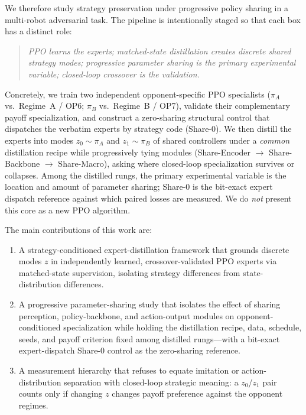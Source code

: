 \documentclass{article}
\begin{document}
We therefore study strategy preservation under progressive policy sharing in a
multi-robot adversarial task. The pipeline is intentionally staged so that each
box has a distinct role:
\begin{quote}
\emph{PPO learns the experts;}
\emph{matched-state distillation creates discrete shared strategy modes;}
\emph{progressive parameter sharing is the primary experimental variable;}
\emph{closed-loop crossover is the validation.}
\end{quote}
Concretely, we train two independent opponent-specific PPO specialists
($\pi_A$ vs.\ Regime~A / OP6; $\pi_B$ vs.\ Regime~B / OP7), validate their
complementary payoff specialization, and construct a zero-sharing structural
control that dispatches the verbatim experts by strategy code (Share-0). We then
distill the experts into modes $z_0\!\sim\!\pi_A$ and $z_1\!\sim\!\pi_B$ of
shared controllers under a \emph{common} distillation recipe while progressively
tying modules (Share-Encoder $\rightarrow$ Share-Backbone $\rightarrow$
Share-Macro), asking where closed-loop specialization survives or collapses.
Among the distilled rungs, the primary experimental variable is the location and
amount of parameter sharing; Share-0 is the bit-exact expert dispatch reference
against which paired losses are measured. We do \emph{not} present this core as
a new PPO algorithm.

The main contributions of this work are:
\begin{enumerate}
  \item A strategy-conditioned expert-distillation framework that grounds
  discrete modes $z$ in independently learned, crossover-validated PPO experts
  via matched-state supervision, isolating strategy differences from
  state-distribution differences.
  \item A progressive parameter-sharing study that isolates the effect of
  sharing perception, policy-backbone, and action-output modules on
  opponent-conditioned specialization while holding the distillation recipe,
  data, schedule, seeds, and payoff criterion fixed among distilled rungs---with
  a bit-exact expert-dispatch Share-0 control as the zero-sharing reference.
  \item A measurement hierarchy that refuses to equate imitation or
  action-distribution separation with closed-loop strategic meaning: a
  $z_0$/$z_1$ pair counts only if changing $z$ changes payoff preference
  against the opponent regimes.
\end{enumerate}
\end{document}
